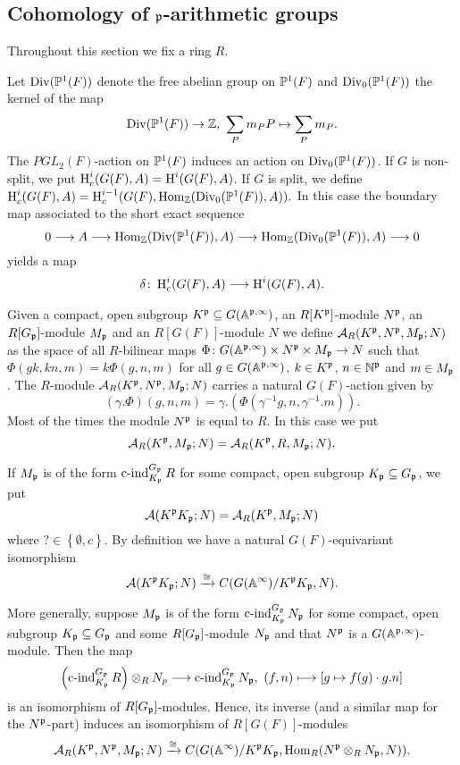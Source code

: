 \subsection{Cohomology of $\p$-arithmetic groups}\label{Cohomology}
Throughout this section we fix a ring $R$.

Let $\Div(\PP(F))$ denote the free abelian group on $\PP(F)$ and $\Div_0(\PP(F))$ the kernel of the map $$\Div(\PP(F)) \to \Z,\ \sum_P m_P P \mapsto \sum_P m_P.$$
The $PGL_2(F)$-action on $\PP(F)$ induces an action on $\Div_0(\PP(F))$.
If $G$ is non-split, we put $\HH^{i}_c(G(F),A)=\HH^{i}(G(F),A)$.
If $G$ is split, we define $\HH^{i}_c(G(F),A)=\HH^{i-1}_c(G(F),\Hom_\Z(\Div_0(\PP(F)),A)).$
In this case the boundary map associated to the short exact sequence
$$0\too A \too\Hom_\Z(\Div(\PP(F)),A)\too\Hom_\Z(\Div_0(\PP(F)),A)\too 0$$
yields a map 
\begin{align}\label{delta}
\delta\colon\HH^{i}_c(G(F),A)\too\HH^{i}(G(F),A).
\end{align}

Given a compact, open subgroup $K^\p\subseteq G(\A\pinfty)$, an $R[K^{\p}]$-module $N^{\p}$, an $R[G_\p]$-module $M_\p$ and an $R[G(F)]$-module $N$ we define $\Ah_{R}(K^{\p},N^{\p},M_\p;N)$ as the space of all $R$-bilinear maps $\Phi\colon G(\A\pinfty) \times N^{\p} \times M_\p\to N$
such that $\Phi(gk,kn,m)=k\Phi(g,n,m)$ for all $g\in  G(\A\pinfty)$, $k\in K^\p$, $n\in\N^{\p}$ and $m\in M_\p$.
The $R$-module $\Ah_R(K^\p,N^\p,M_\p;N)$ carries a natural $G(F)$-action given by
$$(\gamma.\Phi)(g,n,m)=\gamma.(\Phi(\gamma^{-1}g,n,\gamma^{-1}.m)).$$
Most of the times the module $N^{\p}$ is equal to $R$.
In this case we put $$\Ah_R(K^\p,M_\p;N)=\Ah_R(K^\p,R,M_\p;N).$$

\begin{Exa}\label{Example}
If $M_\p$ is of the form $\cind_{K_\p}^{G_\p} R$ for some compact, open subgroup $K_\p\subseteq G_\p$, we put
$$\Ah(K^\p K_\p;N)=\Ah_{R}(K^\p,M_\p;N)$$
where $?\in\left\{\emptyset,c \right\}$.
By definition we have a natural $G(F)$-equivariant isomorphism
$$\Ah(K^\p K_\p;N)\xrightarrow{\cong}C(G(\A^\infty)/K^\p K_\p,N).$$

More generally, suppose $M_\p$ is of the form $\cind_{K_\p}^{G_\p} N_\p$ for some compact, open subgroup $K_\p\subseteq G_\p$ and some $R[G_\p]$-module $N_\p$
and that $N^{\p}$ is a $G(\A\pinfty)$-module.
Then the map
$$\left(\cind_{K_\p}^{G_\p} R\right) \otimes_R N_p \too \cind_{K_\p}^{G_\p} N_\p,\ (f,n)\mapstoo [g \mapsto f(g)\cdot g.n]$$
is an isomorphism of $R[G_\p]$-modules.
Hence, its inverse (and a similar map for the $N^{\p}$-part) induces an isomorphism of $R[G(F)]$-modules
$$\Ah_{R}(K^\p,N^{\p},M_\p;N)\xrightarrow{\cong}C(G(\A^\infty)/K^\p K_\p,\Hom_R(N^{\p}\otimes_R N_\p, N)).$$
\end{Exa}

